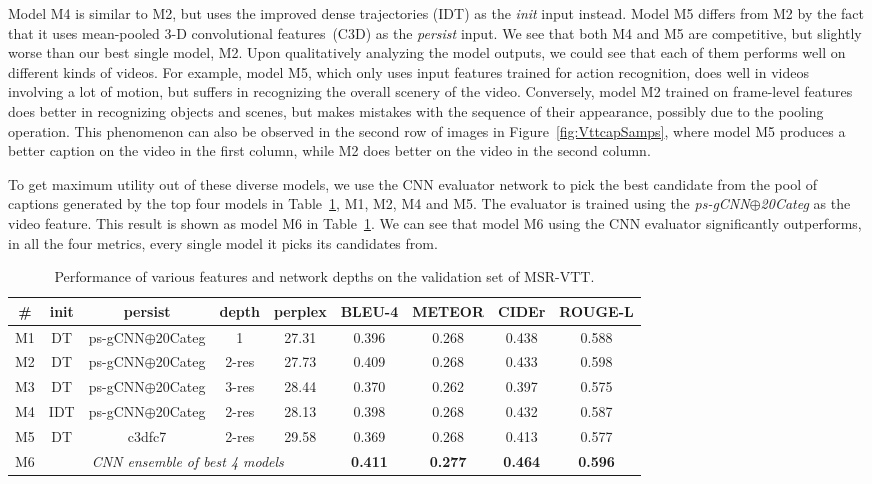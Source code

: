 Model M4 is similar to M2, but uses the improved dense trajectories (IDT) as
the \emph{init} input instead.
Model M5 differs from M2 by the fact that it uses mean-pooled 3-D
convolutional features~(C3D) as the \emph{persist} input.
We see that both M4 and M5 are competitive, but slightly worse than our best
single model, M2.
Upon qualitatively analyzing the model outputs, we could see that each of them
performs well on different kinds of videos.
For example, model M5, which only uses input features trained for action
recognition, does well in videos involving a lot of motion, but suffers in
recognizing the overall scenery of the video.
Conversely, model M2 trained on frame-level features does better in recognizing
objects and scenes, but makes mistakes with the sequence of their appearance,
possibly due to the pooling operation.
This phenomenon can also be observed in the second row of images in
Figure~\ref{fig:VttcapSamps}, where model M5 produces a better caption on the
video in the first column, while M2 does better on the video in the second
column.

To get maximum utility out of these diverse models, we use the CNN evaluator
network to pick the best candidate from the pool of captions generated by the
top four models in Table~\ref{tab:resVttFeat}, M1, M2, M4 and M5.
The evaluator is trained using the \emph{ps-gCNN$\oplus$20Categ} as the video
feature.
This result is shown as model M6 in Table~\ref{tab:resVttFeat}.
We can see that model M6 using the CNN evaluator significantly outperforms, in
all the four metrics, every single model it picks its candidates from.

\begin{table}[tbh]
  \centering
  \begin{adjustbox}{center}
  \newcommand{\bs}{\small\bf}
  \begin{tabular}{|c|c|c|c|c|c|c|c|c|}
    \hline
    \bs\# &\bs init &\bs persist &\bs depth &\bs perplex &\bs BLEU-4 &\bs METEOR &\bs CIDEr &\bs ROUGE-L \\\hline\hline
    M1 & DT  & ps-gCNN$\oplus$20Categ & 1  & 27.31 & 0.396 & 0.268 & 0.438 & 0.588 \\
    M2 & DT  & ps-gCNN$\oplus$20Categ & 2-res  & 27.73 & 0.409 & 0.268 & 0.433 & 0.598 \\
    M3 & DT  & ps-gCNN$\oplus$20Categ & 3-res  & 28.44 & 0.370 & 0.262 & 0.397 & 0.575 \\\hline
    M4 & IDT & ps-gCNN$\oplus$20Categ & 2-res  & 28.13 & 0.398 & 0.268 & 0.432 & 0.587 \\
    M5 & DT  & c3dfc7       & 2-res  & 29.58 & 0.369 & 0.268 & 0.413 & 0.577 \\\hline
    M6 & \multicolumn{4}{c|}{\em CNN ensemble of best 4 models}
                                  & \bf0.411 & \bf0.277 & \bf0.464 & \bf0.596 \\\hline
    \hline
  \end{tabular}
  \end{adjustbox}
  \caption{Performance of various features and network depths on the validation
  set of MSR-VTT.}
  \label{tab:resVttFeat}
\end{table}

